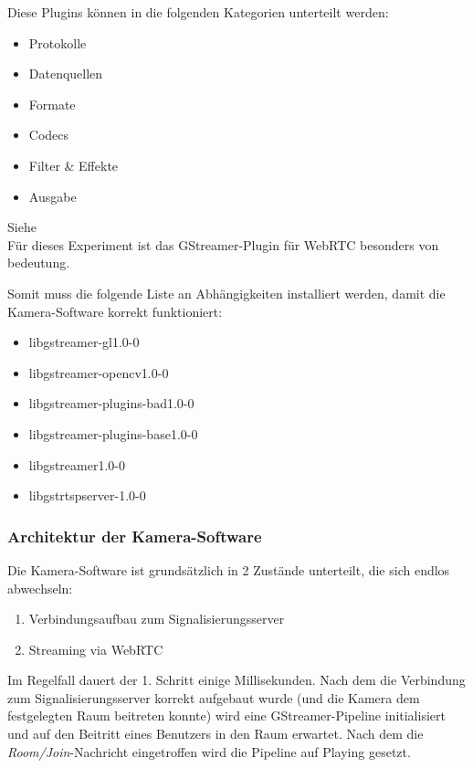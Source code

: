 \documentclass{article}
\begin{document}
\begin{onecolumn}
Diese Plugins können in die folgenden Kategorien unterteilt werden:

\begin{itemize}
	\item Protokolle
	\item Datenquellen
	\item Formate
	\item Codecs
	\item Filter \& Effekte
	\item Ausgabe
\end{itemize}

Siehe~\cite{GStreamerManualIntro}\\

Für dieses Experiment ist das GStreamer-Plugin für WebRTC besonders von
bedeutung.

Somit muss die folgende Liste an Abhängigkeiten installiert werden, damit die
Kamera-Software korrekt funktioniert:

\begin{itemize}\label{items:deps}
	\item libgstreamer-gl1.0-0
	\item libgstreamer-opencv1.0-0
	\item libgstreamer-plugins-bad1.0-0
	\item libgstreamer-plugins-base1.0-0
	\item libgstreamer1.0-0
	\item libgstrtspserver-1.0-0
\end{itemize}

\subsubsection{Architektur der Kamera-Software}

Die Kamera-Software ist grundsätzlich in 2 Zustände unterteilt, die sich endlos
abwechseln:

\begin{enumerate}
	\item Verbindungsaufbau zum Signalisierungsserver
	\item Streaming via WebRTC
\end{enumerate}

Im Regelfall dauert der 1. Schritt einige Millisekunden. Nach dem die
Verbindung zum Signalisierungsserver korrekt aufgebaut wurde (und die Kamera
dem festgelegten Raum beitreten konnte) wird eine GStreamer-Pipeline
initialisiert und auf den Beitritt eines Benutzers in den Raum erwartet. Nach
dem die \textit{Room/Join}-Nachricht eingetroffen wird die Pipeline auf Playing
gesetzt.


\end{onecolumn}
\end{document}
